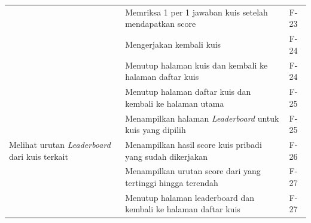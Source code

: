\begin{table}[H]
\begin{tabular}{|m{3cm}|p{}|p{2cm}|}
		\cline{2-3}
		&Memriksa 1 per 1 jawaban kuis setelah mendapatkan score& F-23 \\
		\cline{2-3}
		&Mengerjakan kembali kuis& F-24 \\
		\cline{2-3}
		&Menutup halaman kuis dan kembali ke halaman daftar kuis& F-24 \\
		\cline{2-3}
		&Menutup halaman daftar kuis dan kembali ke halaman utama& F-25 \\
		\hline
		\multirow{3}{3cm}{Melihat urutan \textit{Leaderboard} dari kuis terkait} &Menampilkan halaman \textit{Leaderboard} untuk kuis yang dipilih & F-25 \\
		\cline{2-3}
		&Menampilkan hasil score kuis pribadi yang sudah dikerjakan& F-26 \\
		\cline{2-3}
		&Menampilkan urutan score dari yang tertinggi hingga terendah& F-27 \\
		\cline{2-3}
		&Menutup halaman leaderboard dan kembali ke halaman daftar kuis& F-27 \\
		\hline
	\end{tabular}
\end{table}
\newpage
